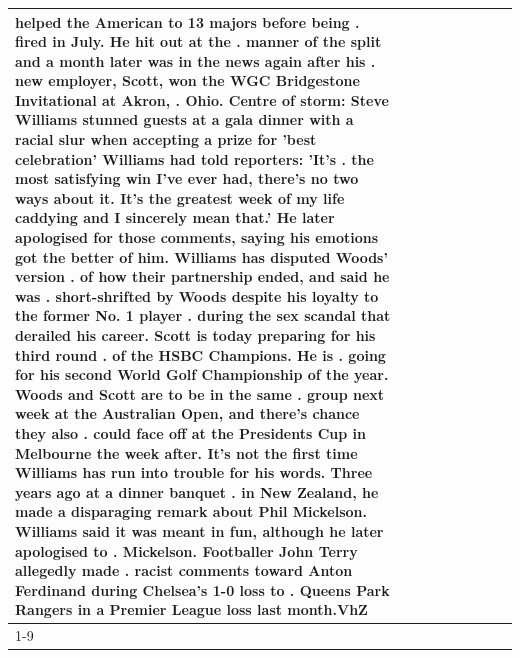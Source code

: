 \begin{table}[H]
\begin{tabular}{lllrlllll}
helped the American to 13 majors before being . fired in July. He hit out at the . manner of the split and a month later was in the news again after his . new employer, Scott, won the WGC Bridgestone Invitational at Akron, . Ohio. Centre of storm: Steve Williams stunned guests at a gala dinner with a racial slur when accepting a prize for 'best celebration' Williams had told reporters: 'It's . the most satisfying win I've ever had, there's no two ways about it. It's the greatest week of my life caddying and I sincerely mean that.' He later apologised for those comments, saying his emotions got the better of him. Williams has disputed Woods' version . of how their partnership ended, and said he was . short-shrifted by Woods despite his loyalty to the former No. 1 player . during the sex scandal that derailed his career. Scott is today preparing for his third round . of the HSBC Champions. He is . going for his second World Golf Championship of the year. Woods and Scott are to be in the same . group next week at the Australian Open, and there's chance they also . could face off at the Presidents Cup in Melbourne the week after. It's not the first time Williams has run into trouble for his words. Three years ago at a dinner banquet . in New Zealand, he made a disparaging remark about Phil Mickelson. Williams said it was meant in fun, although he later apologised to . Mickelson. Footballer John Terry allegedly made . racist comments toward Anton Ferdinand during Chelsea's 1-0 loss to . Queens Park Rangers in a Premier League loss last month.VhZ \\
\cline{1-9}

\end{tabular}
\end{table}
